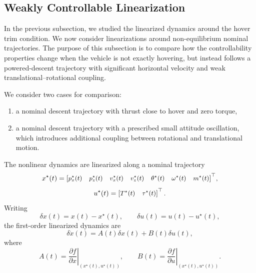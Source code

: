 
\subsection{Weakly Controllable Linearization}

In the previous subsection, we studied the linearized dynamics around the hover trim condition. We now consider linearizations around non-equilibrium nominal trajectories. The purpose of this subsection is to compare how the controllability properties change when the vehicle is not exactly hovering, but instead follows a powered-descent trajectory with significant horizontal velocity and weak translational--rotational coupling.

We consider two cases for comparison:
\begin{enumerate}
    \item a nominal descent trajectory with thrust close to hover and zero torque,
    \item a nominal descent trajectory with a prescribed small attitude oscillation, which introduces additional coupling between rotational and translational motion.
\end{enumerate}

The nonlinear dynamics are linearized along a nominal trajectory
\[
    \small{x^\star(t)
    =
    \begin{bmatrix}
        p_x^\star(t) &
        p_z^\star(t) &
        v_x^\star(t) &
        v_z^\star(t) &
        \theta^\star(t) &
        \omega^\star(t) &
        m^\star(t)
    \end{bmatrix}^{\top}},
\]
\[
   \small{u^\star(t)
    =
    \begin{bmatrix}
        T^\star(t) &
        \tau^\star(t)
    \end{bmatrix}^{\top}.}
\]
Writing
\[
    \delta x(t)=x(t)-x^\star(t),
    \qquad
    \delta u(t)=u(t)-u^\star(t),
\]
the first-order linearized dynamics are
\[
    \delta \dot x(t)
    =
    A(t)\delta x(t)+B(t)\delta u(t),
\]
where
\[
    A(t)
    =
    \left.\frac{\partial f}{\partial x}\right|_{(x^\star(t),u^\star(t))},
    \qquad
    B(t)
    =
    \left.\frac{\partial f}{\partial u}\right|_{(x^\star(t),u^\star(t))}.
\]

